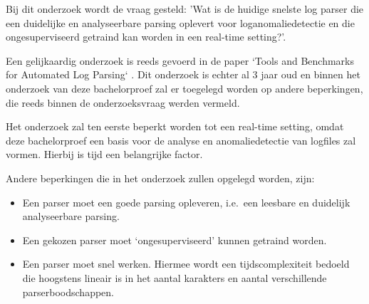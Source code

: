 
Bij dit onderzoek wordt de vraag gesteld: 'Wat is de huidige snelste log parser die een duidelijke en analyseerbare parsing oplevert voor loganomaliedetectie en die ongesuperviseerd getraind kan worden in een real-time setting?'.

Een gelijkaardig onderzoek is reeds gevoerd in de paper `Tools and Benchmarks for Automated Log Parsing` \autocite{TBA2019}. Dit onderzoek is echter al 3 jaar oud en binnen het onderzoek van deze bachelorproef zal er toegelegd worden op andere beperkingen, die reeds binnen de onderzoeksvraag werden vermeld.

Het onderzoek zal ten eerste beperkt worden tot een real-time setting, omdat deze bachelorproef een basis voor de analyse en anomaliedetectie van logfiles zal vormen. Hierbij is tijd een belangrijke factor. 

Andere beperkingen die in het onderzoek zullen opgelegd worden, zijn:
\begin{itemize}
    \item Een parser moet een goede parsing opleveren, i.e.\ een leesbare en duidelijk analyseerbare parsing.
    \item Een gekozen parser moet ‘ongesuperviseerd’ kunnen getraind worden.
    \item Een parser moet snel werken. Hiermee wordt een tijdscomplexiteit bedoeld die hoogstens lineair is in het aantal karakters en aantal verschillende parserboodschappen.
\end{itemize}

\section{}
\label{sec:onderzoeksdoelstelling}


